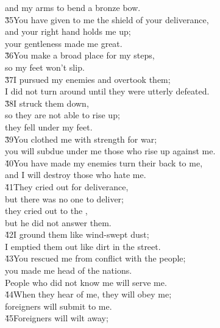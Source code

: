 \begin{poetry}
\poemll    and my arms to bend a bronze bow. \\
\poeml \v{35}You have given to me the shield of your deliverance, \\
\poemll    and your right hand holds me up; \\
\poemlll       your gentleness made me great. \\
\poeml \v{36}You make a broad place for my steps, \\
\poemll    so my feet won't slip. \\
\poeml \v{37}I pursued my enemies and overtook them; \\
\poemll    I did not turn around until they were utterly defeated. \\
\poeml \v{38}I struck them down, \\
\poemll    so they are not able to rise up; \\
\poemlll       they fell under my feet. \\
\poeml \v{39}You clothed me with strength for war; \\
\poemll    you will subdue under me those who rise up against me. \\
\poeml \v{40}You have made my enemies turn their back to me, \\
\poemll    and I will destroy those who hate me. \\
\poeml \v{41}They cried out for deliverance, \\
\poemll    but there was no one to deliver; \\
\poeml they cried out to the , \\
\poemll    but he did not answer them. \\
\poeml \v{42}I ground them like wind-swept dust; \\
\poemll    I emptied them out like dirt in the street. \\
\poeml \v{43}You rescued me from conflict with the people; \\
\poemll    you made me head of the nations. \\
\poemlll       People who did not know me will serve me. \\
\poeml \v{44}When they hear of me, they will obey me; \\
\poemll    foreigners will submit to me. \\
\poeml \v{45}Foreigners will wilt away; \\

\end{poetry}
